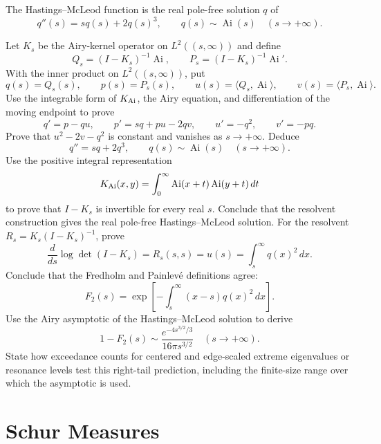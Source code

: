 \begin{exercise}
The Hastings--McLeod function is the real pole-free solution $q$ of
\[
q''(s)=s q(s)+2q(s)^3,
\qquad q(s)\sim\operatorname{Ai}(s)\quad(s\to+\infty).
\]

Let $K_s$ be the Airy-kernel operator on $L^2((s,\infty))$ and define
\[
Q_s=(I-K_s)^{-1}\operatorname{Ai},
\qquad
P_s=(I-K_s)^{-1}\operatorname{Ai}'.
\]
With the inner product on $L^2((s,\infty))$, put
\[
q(s)=Q_s(s),\qquad p(s)=P_s(s),
\qquad
u(s)=\langle Q_s,\operatorname{Ai}\rangle,
\qquad
v(s)=\langle P_s,\operatorname{Ai}\rangle.
\]
Use the integrable form of $K_{\rm Ai}$, the Airy equation, and
differentiation of the moving endpoint to prove
\[
q'=p-qu,
\qquad
p'=sq+pu-2qv,
\qquad
u'=-q^2,
\qquad
v'=-pq.
\]
Prove that $u^2-2v-q^2$ is constant and vanishes as $s\to+\infty$.
Deduce
\[
q''=sq+2q^3,
\qquad
q(s)\sim\operatorname{Ai}(s)\quad(s\to+\infty).
\]
Use the positive integral representation
\[
K_{\rm Ai}(x,y)=\int_0^\infty
\operatorname{Ai}(x+t)\operatorname{Ai}(y+t)\,dt
\]
to prove that $I-K_s$ is invertible for every real $s$.  Conclude that the
resolvent construction gives the real pole-free Hastings--McLeod solution.
For the resolvent $R_s=K_s(I-K_s)^{-1}$, prove
\[
\frac d{ds}\log\det(I-K_s)=R_s(s,s)=u(s)
=\int_s^\infty q(x)^2\,dx.
\]
Conclude that the Fredholm and Painlev\'e definitions agree:
\[
F_2(s)
=\exp\!\left[-\int_s^\infty(x-s)q(x)^2\,dx\right].
\]
Use the Airy asymptotic of the Hastings--McLeod solution to derive
\[
1-F_2(s)
\sim\frac{e^{-4s^{3/2}/3}}{16\pi s^{3/2}}
\quad(s\to+\infty).
\]
State how exceedance counts for centered and edge-scaled extreme eigenvalues
or resonance levels test this right-tail prediction, including the
finite-size range over which the asymptotic is used.
\end{exercise}

\section{Schur Measures}


